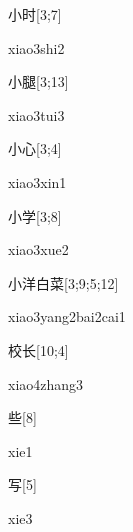 \begin{verbete}{小时}[3;7]
\begin{pronuncia}{xiao3shi2}
\end{pronuncia}
\end{verbete}

\begin{verbete}{小腿}[3;13]
\begin{pronuncia}{xiao3tui3}
\end{pronuncia}
\end{verbete}

\begin{verbete}{小心}[3;4]
\begin{pronuncia}{xiao3xin1}
\end{pronuncia}
\end{verbete}

\begin{verbete}{小学}[3;8]
\begin{pronuncia}{xiao3xue2}
\end{pronuncia}
\end{verbete}

\begin{verbete}{小洋白菜}[3;9;5;12]
  \begin{pronuncia}[\\]{xiao3yang2bai2cai1}
\end{pronuncia}
\end{verbete}

\begin{verbete}{校长}[10;4]
\begin{pronuncia}{xiao4zhang3}
\end{pronuncia}
\end{verbete}

\begin{verbete}[xie1]{些}[8]
\begin{pronuncia}{xie1}
\end{pronuncia}
\end{verbete}

\begin{verbete}[xie3]{写}[5]
\begin{pronuncia}{xie3}
\end{pronuncia}
\end{verbete}

